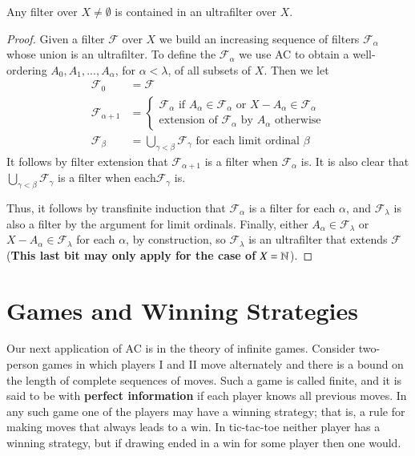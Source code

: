 \documentclass[12pt, a4paper, oneside, openright, titlepage]{book}
\begin{document}
\begin{thm}
    Any filter over $X\neq \emptyset$ is contained in an ultrafilter over $X$.
\end{thm}
\begin{proof}
    Given a filter $\mathcal{F}$ over $X$ we build an increasing sequence of filters $\mathcal{F}_{\alpha}$ whose union is an ultrafilter. To define the $\mathcal{F}_{\alpha}$ we use AC to obtain a well-ordering $A_0,A_1,...,A_{\alpha}$, for $\alpha < \lambda$, of all subsets of $X$. Then we let \begin{align*}
        \mathcal{F}_0 &= \mathcal{F} \\
        \mathcal{F}_{\alpha+1} &= \left\{\begin{array}{cc} \mathcal{F}_{\alpha}\text{ if }A_{\alpha} \in \mathcal{F}_{\alpha}\text{ or }X-A_{\alpha} \in \mathcal{F}_{\alpha} \\ \text{extension of }\mathcal{F}_{\alpha}\text{ by }A_{\alpha}\text{ otherwise} \end{array}\right. \\
        \mathcal{F}_{\beta} &= \bigcup_{\gamma < \beta}\mathcal{F}_{\gamma}\text{ for each limit ordinal $\beta$}
    \end{align*}
    It follows by filter extension that $\mathcal{F}_{\alpha+1}$ is a filter when $\mathcal{F}_{\alpha}$ is. It is also clear that $\bigcup_{\gamma < \beta}\mathcal{F}_{\gamma}$ is a filter when each$\mathcal{F}_{\gamma}$ is.

    Thus, it follows by transfinite induction that $\mathcal{F}_{\alpha}$ is a filter for each $\alpha$, and $\mathcal{F}_{\lambda}$ is also a filter by the argument for limit ordinals. Finally, either $A_{\alpha} \in \mathcal{F}_{\lambda}$ or $X-A_{\alpha} \in \mathcal{F}_{\lambda}$ for each $\alpha$, by construction, so $\mathcal{F}_{\lambda}$ is an ultrafilter that extends $\mathcal{F}$ (\textbf{This last bit may only apply for the case of $X = \mathbb N$}).
\end{proof}


\section{Games and Winning Strategies}

Our next application of AC is in the theory of infinite games. Consider two-person games in which players I and II move alternately and there is a bound on the length of complete sequences of moves. Such a game is called finite, and it is said to be with \textbf{perfect information} if each player knows all previous moves. In any such game one of the players may have a winning strategy; that is, a rule for making moves that always leads to a win. In tic-tac-toe neither player has a winning strategy, but if drawing ended in a win for some player then one would.
\end{document}
